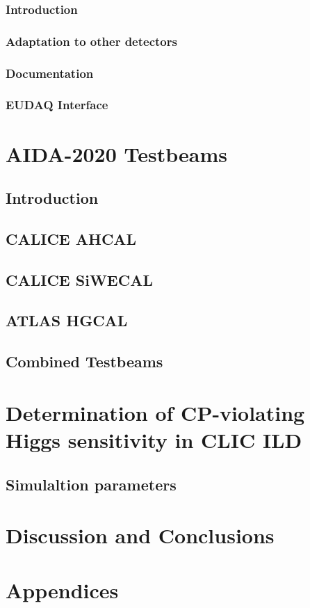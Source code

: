 \documentclass[]{article}
\begin{document}
\subsubsection{Introduction}
\subsubsection{Adaptation to other detectors}
\subsubsection{Documentation}
\subsubsection{EUDAQ Interface}

\section{AIDA-2020 Testbeams}

\subsection{Introduction}

\subsection{CALICE AHCAL}

\subsection{CALICE SiWECAL}

\subsection{ATLAS HGCAL}

\subsection{Combined Testbeams}

\section{Determination of CP-violating Higgs sensitivity in CLIC ILD}

\subsection{Simulaltion parameters}

\section{Discussion and Conclusions}

\section{Appendices}
\end{document}
